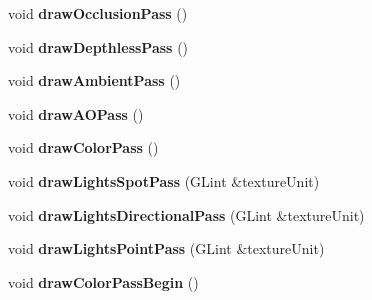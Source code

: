 \begin{DoxyCompactItemize}
\item 
\hypertarget{structfillwave_1_1Engine_1_1EngineImpl_a2896d5491097b4d6d79a9af88a907a1d}{}void {\bfseries draw\+Occlusion\+Pass} ()\label{structfillwave_1_1Engine_1_1EngineImpl_a2896d5491097b4d6d79a9af88a907a1d}

\item 
\hypertarget{structfillwave_1_1Engine_1_1EngineImpl_a690196b3cf17c2315c9fd691b456a452}{}void {\bfseries draw\+Depthless\+Pass} ()\label{structfillwave_1_1Engine_1_1EngineImpl_a690196b3cf17c2315c9fd691b456a452}

\item 
\hypertarget{structfillwave_1_1Engine_1_1EngineImpl_a5b66b89d82857b57745fd04d4360a30a}{}void {\bfseries draw\+Ambient\+Pass} ()\label{structfillwave_1_1Engine_1_1EngineImpl_a5b66b89d82857b57745fd04d4360a30a}

\item 
\hypertarget{structfillwave_1_1Engine_1_1EngineImpl_a44a9ed999d42baee3088db2dc3d035e9}{}void {\bfseries draw\+A\+O\+Pass} ()\label{structfillwave_1_1Engine_1_1EngineImpl_a44a9ed999d42baee3088db2dc3d035e9}

\item 
\hypertarget{structfillwave_1_1Engine_1_1EngineImpl_ae44d13e7727298978931fc0194757ef3}{}void {\bfseries draw\+Color\+Pass} ()\label{structfillwave_1_1Engine_1_1EngineImpl_ae44d13e7727298978931fc0194757ef3}

\item 
\hypertarget{structfillwave_1_1Engine_1_1EngineImpl_ac1f73527fb62e97d5dad344cee0c8d39}{}void {\bfseries draw\+Lights\+Spot\+Pass} (G\+Lint \&texture\+Unit)\label{structfillwave_1_1Engine_1_1EngineImpl_ac1f73527fb62e97d5dad344cee0c8d39}

\item 
\hypertarget{structfillwave_1_1Engine_1_1EngineImpl_a55ce42ae579120d2e9b6288615e59944}{}void {\bfseries draw\+Lights\+Directional\+Pass} (G\+Lint \&texture\+Unit)\label{structfillwave_1_1Engine_1_1EngineImpl_a55ce42ae579120d2e9b6288615e59944}

\item 
\hypertarget{structfillwave_1_1Engine_1_1EngineImpl_abe254a80f34cc134b8c30fa553f70522}{}void {\bfseries draw\+Lights\+Point\+Pass} (G\+Lint \&texture\+Unit)\label{structfillwave_1_1Engine_1_1EngineImpl_abe254a80f34cc134b8c30fa553f70522}

\item 
\hypertarget{structfillwave_1_1Engine_1_1EngineImpl_a7b1f3dc244c87e91a53f4099ea595417}{}void {\bfseries draw\+Color\+Pass\+Begin} ()\label{structfillwave_1_1Engine_1_1EngineImpl_a7b1f3dc244c87e91a53f4099ea595417}


\end{DoxyCompactItemize}
